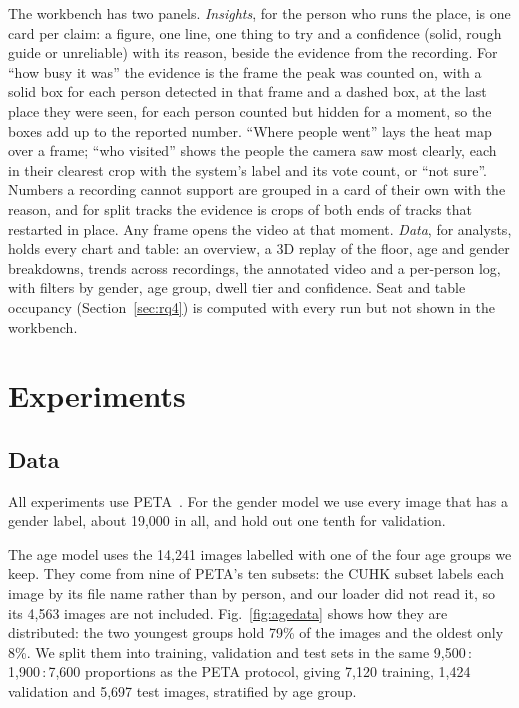 \documentclass[conference]{IEEEtran}
\begin{document}
The workbench has two panels. \emph{Insights}, for the person who runs the
place, is one card per claim: a figure, one line, one thing to try and a
confidence (solid, rough guide or unreliable) with its reason, beside the evidence
from the recording. For ``how busy it was'' the evidence is the frame the peak was
counted on, with a solid box for each person detected in that frame and a dashed
box, at the last place they were seen, for each person counted but hidden for a
moment, so the boxes add up to the reported number. ``Where people went'' lays the
heat map over a frame; ``who visited'' shows the people the camera saw most
clearly, each in their clearest crop with the system's label and its vote count,
or ``not sure''. Numbers a recording cannot support are grouped in a card of their
own with the reason, and for split tracks the evidence is crops of both ends of
tracks that restarted in place. Any frame opens the video at that moment.
\emph{Data}, for analysts, holds every chart and table: an overview, a 3D replay
of the floor, age and gender breakdowns, trends across recordings, the annotated
video and a per-person log, with filters by gender, age group, dwell tier and
confidence. Seat and table occupancy (Section~\ref{sec:rq4}) is computed with
every run but not shown in the workbench.

\section{Experiments}
\label{sec:experiments}

\subsection{Data}
\label{sec:data}
All experiments use PETA~\cite{deng2014peta}. For the gender model we use every
image that has a gender label, about 19,000 in all, and hold out one tenth for
validation.

The age model uses the 14,241 images labelled with one of the four age groups we
keep. They come from nine of PETA's ten subsets: the CUHK subset labels each image
by its file name rather than by person, and our loader did not read it, so its
4,563 images are not included. Fig.~\ref{fig:agedata} shows how they are distributed: the two youngest
groups hold 79\% of the images and the oldest only 8\%. We split them into
training, validation and test sets in the same 9,500\,:\,1,900\,:\,7,600
proportions as the PETA protocol, giving 7,120 training, 1,424 validation and
5,697 test images, stratified by age group.
\end{document}
